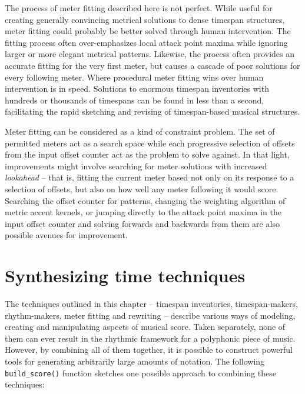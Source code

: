 \noindent The process of meter fitting described here is not perfect. While
useful for creating generally convincing metrical solutions to dense timespan
structures, meter fitting could probably be better solved through human
intervention. The fitting process often over-emphasizes local attack point
maxima while ignoring larger or more elegant metrical patterns. Likewise, the
process often provides an accurate fitting for the very first meter, but causes
a cascade of poor solutions for every following meter. Where procedural meter
fitting wins over human intervention is in speed. Solutions to enormous
timespan inventories with hundreds or thousands of timespans can be found in
less than a second, facilitating the rapid sketching and revising of
timespan-based musical structures.

Meter fitting can be considered as a kind of constraint problem. The set of
permitted meters act as a search space while each progressive selection of
offsets from the input offset counter act as the problem to solve against. In
that light, improvements might involve searching for meter solutions with
increased \emph{lookahead} -- that is, fitting the current meter based not only
on its response to a selection of offsets, but also on how well any meter
following it would score. Searching the offset counter for patterns, changing
the weighting algorithm of metric accent kernels, or jumping directly to the
attack point maxima in the input offset counter and solving forwards and
backwards from them are also possible avenues for improvement.

\section{Synthesizing time techniques}
\label{sec:synthesizing-time-techniques}

The techniques outlined in this chapter -- timespan inventories,
timespan-makers, rhythm-makers, meter fitting and rewriting -- describe various
ways of modeling, creating and manipulating aspects of musical score. Taken
separately, none of them can ever result in the rhythmic framework for a
polyphonic piece of music. However, by combining all of them together, it is
possible to construct powerful tools for generating arbitrarily large amounts
of notation. The following \texttt{build\_score()} function sketches one
possible approach to combining these techniques:

